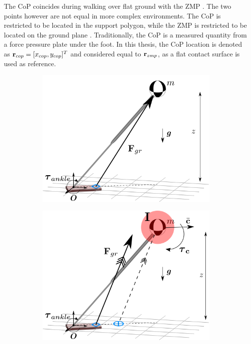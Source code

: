 The \ac{CoP} coincides during walking over flat ground with the \ac{ZMP} \cite{vukobratovic2004zero}. The two points however are not equal in more complex environments. The \ac{CoP} is restricted to be located in the support polygon, while the \ac{ZMP} is restricted to be located on the ground plane  \cite{sardain2004forces}. Traditionally, the \ac{CoP} is a measured quantity from a force pressure plate under the foot. In this thesis, the \ac{CoP} location is denoted as $\mathbf{r}_{cop} = [x_{cop}, y_{cop}]^T$ and considered equal to $\mathbf{r}_{zmp}$, as a flat contact surface is used as reference.
\begin{figure}
\centering
\begin{subfigure}{0.49\textwidth}
\centering
\includegraphics[width=.95\linewidth]{STYLESTUFF/3DCoPviz1.png}
\caption{}
\label{fig:3dlipfoot}
\end{subfigure}
\begin{subfigure}{0.49\textwidth}
\centering
\includegraphics[width=.95\linewidth]{STYLESTUFF/3DCMPCoPviz1.png}	

\end{subfigure}
\end{figure}
